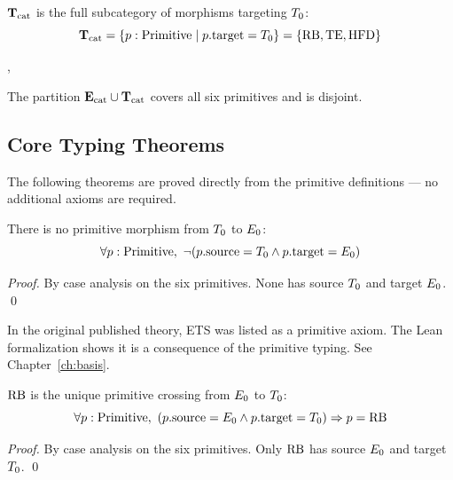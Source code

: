 \begin{definition}
$\mathbf{T}_{\mathrm{cat}}$ is the full subcategory of morphisms targeting $T_0$:
\[
  \mathbf{T}_{\mathrm{cat}} = \{p : \mathrm{Primitive} \mid p.\mathrm{target} = T_0\}
        = \{\mathrm{RB}, \mathrm{TE}, \mathrm{HFD}\}
\]
\end{definition}

, 

The partition $\mathbf{E}_{\mathrm{cat}} \cup \mathbf{T}_{\mathrm{cat}}$ covers all six primitives and is disjoint.

\subsection{Core Typing Theorems}

The following theorems are proved directly from the primitive definitions --- no
additional axioms are required.

\begin{theorem}
There is no primitive morphism from $T_0$ to $E_0$:
\[
  \forall p : \mathrm{Primitive},\
  \neg(p.\mathrm{source} = T_0 \wedge p.\mathrm{target} = E_0)
\]
\end{theorem}
\begin{proof}
By case analysis on the six primitives. None has source $T_0$ and target
$E_0$. \qed
\end{proof}

\begin{remark}
In the original published theory, ETS was listed as a primitive axiom. The Lean
formalization shows it is a consequence of the primitive typing. See
Chapter~\ref{ch:basis}.
\end{remark}

\begin{theorem}
$\mathrm{RB}$ is the unique primitive crossing from $E_0$ to $T_0$:
\[
  \forall p : \mathrm{Primitive},\
  (p.\mathrm{source} = E_0 \wedge p.\mathrm{target} = T_0) \Rightarrow p = \mathrm{RB}
\]
\end{theorem}
\begin{proof}
By case analysis on the six primitives. Only $\mathrm{RB}$ has source $E_0$ and target
$T_0$. \qed
\end{proof}

